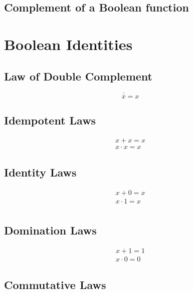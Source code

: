 \documentclass[12pt letter]{report}
\begin{document}
\subsection{Complement of a Boolean function}


\section{Boolean Identities}

\subsection{Law of Double Complement}

\[
  \overline{\overline{x}} = x
\]

\subsection{Idempotent Laws}

\begin{align*}
  x + x = x \\
  x \cdot x = x
\end{align*}

\subsection{Identity Laws}

\begin{align*}
  x + 0 = x     \\
  x \cdot 1 = x \\
\end{align*}

\subsection{Domination Laws}

\begin{align*}
  x + 1 = 1 \\
  x \cdot 0 = 0
\end{align*}

\subsection{Commutative Laws}
\end{document}
